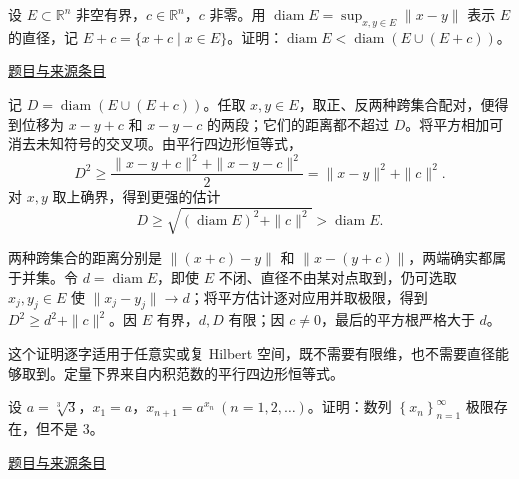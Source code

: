 \documentclass[UTF8,12pt,a4paper,fontset=fandol]{ctexart}
\begin{document}
\begin{example}[来源序号5]\label{ex:ch03-15th-A:5}\label{pr:ch03-15th-A:5}

设 $E \subset \mathbb{R}^n$ 非空有界，$c \in \mathbb{R}^n$，$c$ 非零。用 $\operatorname{diam} E = \sup_{x,y \in E} \|x - y\|$ 表示 $E$ 的直径，记 $E + c = \{x + c \mid x \in E\}$。证明：$\operatorname{diam} E < \operatorname{diam}(E \cup (E + c))$。

\par\href{https://github.com/lzxcr/cmc-mathematics/blob/64916fa1fdbc3e444a652eca204d5669058ee321/src/problems/preliminary/15/05.md}{题目与来源条目}

\end{example}

\begin{solve}\label{ans:ch03-15th-A:5}

记 $D=\operatorname{diam}(E\cup(E+c))$。任取 $x,y\in E$，取正、反两种跨集合配对，便得到位移为 $x-y+c$ 和 $x-y-c$ 的两段；它们的距离都不超过 $D$。将平方相加可消去未知符号的交叉项。由平行四边形恒等式，
\[
D^2\geq\frac{\|x-y+c\|^2+\|x-y-c\|^2}{2}
=\|x-y\|^2+\|c\|^2.
\]
对 $x,y$ 取上确界，得到更强的估计
\[
D\geq\sqrt{(\operatorname{diam}E)^2+\|c\|^2}
>\operatorname{diam}E.
\]

两种跨集合的距离分别是 $\|(x+c)-y\|$ 和 $\|x-(y+c)\|$，两端确实都属于并集。令 $d=\operatorname{diam}E$，即使 $E$ 不闭、直径不由某对点取到，仍可选取 $x_j,y_j\in E$ 使 $\|x_j-y_j\|\to d$；将平方估计逐对应用并取极限，得到 $D^2\ge d^2+\|c\|^2$。因 $E$ 有界，$d,D$ 有限；因 $c\ne0$，最后的平方根严格大于 $d$。

\end{solve}

\begin{remark}[方法与条件]这个证明逐字适用于任意实或复 Hilbert 空间，既不需要有限维，也不需要直径能够取到。定量下界来自内积范数的平行四边形恒等式。\end{remark}

\begin{example}[来源序号6]\label{ex:ch03-15th-A:6}\label{pr:ch03-15th-A:6}

设 $a = \sqrt[3]{3}$，$x_1 = a$，$x_{n+1} = a^{x_n}\ (n = 1, 2, \ldots)$。证明：数列 $\left\{x_n\right\}_{n=1}^{\infty}$ 极限存在，但不是 3。

\par\href{https://github.com/lzxcr/cmc-mathematics/blob/64916fa1fdbc3e444a652eca204d5669058ee321/src/problems/preliminary/15/06.md}{题目与来源条目}

\end{example}
\end{document}
